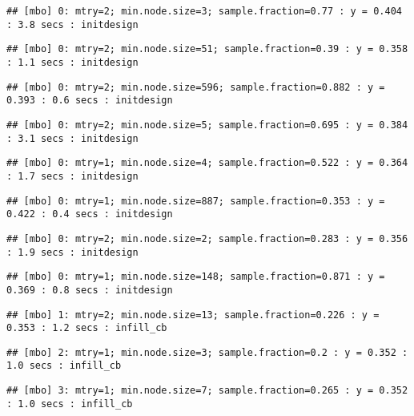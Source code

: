 \documentclass[
]{article}
\begin{document}
\begin{verbatim}
## [mbo] 0: mtry=2; min.node.size=3; sample.fraction=0.77 : y = 0.404 : 3.8 secs : initdesign
\end{verbatim}

\begin{verbatim}
## [mbo] 0: mtry=2; min.node.size=51; sample.fraction=0.39 : y = 0.358 : 1.1 secs : initdesign
\end{verbatim}

\begin{verbatim}
## [mbo] 0: mtry=2; min.node.size=596; sample.fraction=0.882 : y = 0.393 : 0.6 secs : initdesign
\end{verbatim}

\begin{verbatim}
## [mbo] 0: mtry=2; min.node.size=5; sample.fraction=0.695 : y = 0.384 : 3.1 secs : initdesign
\end{verbatim}

\begin{verbatim}
## [mbo] 0: mtry=1; min.node.size=4; sample.fraction=0.522 : y = 0.364 : 1.7 secs : initdesign
\end{verbatim}

\begin{verbatim}
## [mbo] 0: mtry=1; min.node.size=887; sample.fraction=0.353 : y = 0.422 : 0.4 secs : initdesign
\end{verbatim}

\begin{verbatim}
## [mbo] 0: mtry=2; min.node.size=2; sample.fraction=0.283 : y = 0.356 : 1.9 secs : initdesign
\end{verbatim}

\begin{verbatim}
## [mbo] 0: mtry=1; min.node.size=148; sample.fraction=0.871 : y = 0.369 : 0.8 secs : initdesign
\end{verbatim}

\begin{verbatim}
## [mbo] 1: mtry=2; min.node.size=13; sample.fraction=0.226 : y = 0.353 : 1.2 secs : infill_cb
\end{verbatim}

\begin{verbatim}
## [mbo] 2: mtry=1; min.node.size=3; sample.fraction=0.2 : y = 0.352 : 1.0 secs : infill_cb
\end{verbatim}

\begin{verbatim}
## [mbo] 3: mtry=1; min.node.size=7; sample.fraction=0.265 : y = 0.352 : 1.0 secs : infill_cb
\end{verbatim}
\end{document}
